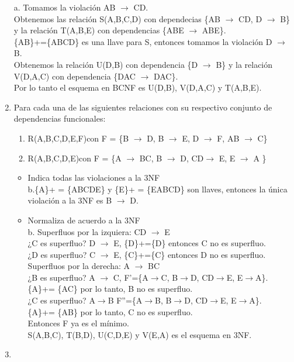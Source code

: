 \documentclass[a4paper, 12pt]{report}
\begin{document}
\begin{enumerate}
{\begin{itemize}
	a. Tomamos la violación AB $\rightarrow$ CD.\\
	Obtenemos las relación S(A,B,C,D) con dependecias \{AB $\rightarrow$ CD,
	D $\rightarrow$ B\} y la relación T(A,B,E) con dependencias \{ABE $\rightarrow$ ABE\}.\\
	\{AB\}+=\{ABCD\} es una llave para S, entonces tomamos la violación D $\rightarrow$ B.\\
	Obtenemos la relación U(D,B) con dependencia \{D $\rightarrow$ B\} y la
	relación V(D,A,C) con dependencia \{DAC $\rightarrow$ DAC\}.\\
	Por lo tanto el esquema en BCNF es U(D,B), V(D,A,C) y T(A,B,E).
\end{itemize}}
\item Para cada una de  las  siguientes  relaciones  con  su  respectivo  conjunto  de  dependencias funcionales:
\begin{enumerate}
	\item R(A,B,C,D,E,F)con F = \{B $\rightarrow$ D, B $\rightarrow$ E, D $\rightarrow$ F, AB $\rightarrow$ C\}
	\item R(A,B,C,D,E)con F = \{A $\rightarrow$ BC, B $\rightarrow$ D, CD$\rightarrow$ E, E $\rightarrow$ A \}
\end{enumerate}
\begin{itemize}
	\item Indica todas las violaciones a la 3NF\\
	b.\{A\}+ = \{ABCDE\} y \{E\}+ = \{EABCD\} son llaves, entonces la única 
	violación a la 3NF es B $\rightarrow$ D.
	\item Normaliza de acuerdo a la 3NF\\
	b. Superfluos por la izquiera:  CD $\rightarrow$ E\\
	¿C es superfluo? D $\rightarrow$ E, \{D\}+=\{D\} entonces C no es superfluo.\\
	¿D es superfluo? C $\rightarrow$ E, \{C\}+=\{C\} entonces D no es superfluo.\\
	Superfluos por la derecha: A $\rightarrow$ BC\\
	¿B es superfluo? A $\rightarrow$ C, F'=\{A$\rightarrow$C, B$\rightarrow$D, CD$\rightarrow$E, E$\rightarrow$A\}.\\
	\{A\}+= \{AC\} por lo tanto, B no es superfluo.\\
	¿C es superfluo? A$\rightarrow$B F''=\{A$\rightarrow$B, B$\rightarrow$D, CD$\rightarrow$E, E$\rightarrow$A\}.\\
	\{A\}+= \{AB\} por lo tanto, C no es superfluo.\\
	Entonces F ya es el mínimo.\\
	S(A,B,C), T(B,D), U(C,D,E) y V(E,A) es el esquema en 3NF.
\end{itemize}
\item 


\end{enumerate}
\end{document}
